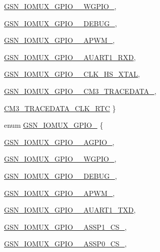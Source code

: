 \begin{DoxyCompactItemize}
\par
\hyperlink{a00519_a56c91a56c00dd218c4082263705bfb9caa7957ab0bd80d86992d65ca8d8d3460d}{GSN\_\-IOMUX\_\-GPIO\_\_\-WGPIO\_}, 
\par
\hyperlink{a00519_a56c91a56c00dd218c4082263705bfb9ca70ba1f352eecbd48f1c74aa9c28e4aab}{GSN\_\-IOMUX\_\-GPIO\_\_\-DEBUG\_}, 
\par
\hyperlink{a00519_a56c91a56c00dd218c4082263705bfb9ca4637f7e91c23c71eb70e148b3d30830e}{GSN\_\-IOMUX\_\-GPIO\_\_\-APWM\_}, 
\par
\hyperlink{a00519_a56c91a56c00dd218c4082263705bfb9cab2a605d32277544683b8bc8a097e5c59}{GSN\_\-IOMUX\_\-GPIO\_\_\-AUART1\_\-RXD}, 
\par
\hyperlink{a00519_a56c91a56c00dd218c4082263705bfb9ca69f39fd52a3cbac88d61ee0a954c6eb3}{GSN\_\-IOMUX\_\-GPIO\_\_\-CLK\_\-HS\_\-XTAL}, 
\par
\hyperlink{a00519_a56c91a56c00dd218c4082263705bfb9caf24d351cbb8913c93f9e624675c1d8c7}{GSN\_\-IOMUX\_\-GPIO\_\_\-CM3\_\-TRACEDATA\_}, 
\par
\hyperlink{a00519_a56c91a56c00dd218c4082263705bfb9cab94d35b1d91c2d1da88161592cc594d8}{CM3\_\-TRACEDATA\_\-CLK\_\-RTC}
 \}
\item 
enum \hyperlink{a00519_a367109678df687289a7897b0cfd80b4a}{GSN\_\-IOMUX\_\-GPIO\_} \{ \par
\hyperlink{a00519_a367109678df687289a7897b0cfd80b4aaed537574ad55ad6974baebadee874849}{GSN\_\-IOMUX\_\-GPIO\_\_\-AGPIO\_}, 
\par
\hyperlink{a00519_a367109678df687289a7897b0cfd80b4aa96395ba8c9f80366e049ed03a9d2b624}{GSN\_\-IOMUX\_\-GPIO\_\_\-WGPIO\_}, 
\par
\hyperlink{a00519_a367109678df687289a7897b0cfd80b4aa5a7ebd7e1c03cf8b003e491cdeb649f8}{GSN\_\-IOMUX\_\-GPIO\_\_\-DEBUG\_}, 
\par
\hyperlink{a00519_a367109678df687289a7897b0cfd80b4aa81697018f9e3181f88dd60c95e0352d8}{GSN\_\-IOMUX\_\-GPIO\_\_\-APWM\_}, 
\par
\hyperlink{a00519_a367109678df687289a7897b0cfd80b4aad6639358322e0f58a019c5034e44bdff}{GSN\_\-IOMUX\_\-GPIO\_\_\-AUART1\_\-TXD}, 
\par
\hyperlink{a00519_a367109678df687289a7897b0cfd80b4aae9429cabd2eb43470ff05f6d4ec7b25b}{GSN\_\-IOMUX\_\-GPIO\_\_\-ASSP1\_\-CS\_}, 
\par
\hyperlink{a00519_a367109678df687289a7897b0cfd80b4aa725433a98c97219a45513576ce927d99}{GSN\_\-IOMUX\_\-GPIO\_\_\-ASSP0\_\-CS\_}, 

\end{DoxyCompactItemize}
